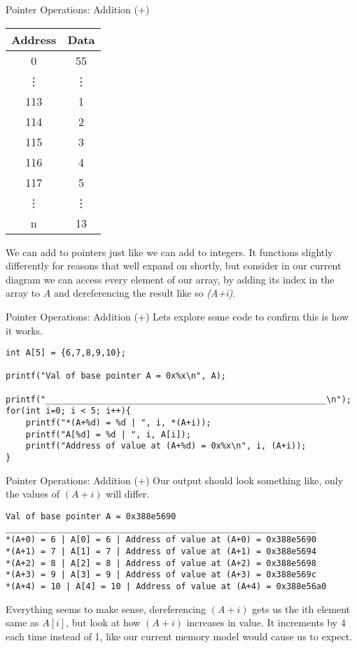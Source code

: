 \documentclass[10pt]{beamer}
\begin{document}
\begin{frame}[fragile]{Pointer Operations: Addition (+)}
\begin{tabular}{|c|c|}
		\hline
		Address & Data\\
		\hline
		0 & 55 \\
		\hline
		\vdots & \vdots \\
		\hline
		113 & 1\\
		\hline
		114 & 2 \\
		\hline
		115 & 3 \\
		\hline
		116 & 4 \\
		\hline
		117 & 5 \\
		\hline
		\vdots & \vdots \\
		n & 13\\
		\hline
	\end{tabular}

	We can add to pointers just like we can add to integers. It functions slightly differently for reasons that well expand on shortly, but consider in our current diagram we can access every element of our array, by adding its index in the array to $A$ and dereferencing the result like so {\it *(A+i)}.
\end{frame}

\begin{frame}[fragile]{Pointer Operations: Addition (+)}
	Lets explore some code to confirm this is how it works.
\begin{verbatim}
int A[5] = {6,7,8,9,10};

printf("Val of base pointer A = 0x%x\n", A);

printf("________________________________________________________\n");
for(int i=0; i < 5; i++){
	printf("*(A+%d) = %d | ", i, *(A+i));
	printf("A[%d] = %d | ", i, A[i]);
	printf("Address of value at (A+%d) = 0x%x\n", i, (A+i));
}
\end{verbatim}
\end{frame}

\begin{frame}[fragile]{Pointer Operations: Addition (+)}
Our output should look something like, only the values of $(A+i)$ will differ.
\begin{verbatim}
Val of base pointer A = 0x388e5690
______________________________________________________________
*(A+0) = 6 | A[0] = 6 | Address of value at (A+0) = 0x388e5690
*(A+1) = 7 | A[1] = 7 | Address of value at (A+1) = 0x388e5694
*(A+2) = 8 | A[2] = 8 | Address of value at (A+2) = 0x388e5698
*(A+3) = 9 | A[3] = 9 | Address of value at (A+3) = 0x388e569c
*(A+4) = 10 | A[4] = 10 | Address of value at (A+4) = 0x388e56a0
\end{verbatim}
Everything seems to make sense, dereferencing $(A+i)$ gets us the ith element same as $A[i]$, but look at how $(A+i)$ increases in value. It increments by 4 each time instead of 1, like our current memory model would cause us to expect.
\end{frame}
\end{document}
